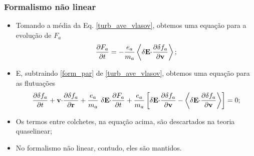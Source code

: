 \documentclass[10pt,aspectratio=1610,lualatex]{beamer}
\begin{document}
\begin{frame}
  \frametitle{Formalismo não linear}
  \begin{itemize}
    \item Tomando a média da Eq. \eqref{turb_ave_vlasov}, obtemos uma
    equação para a evolução de $F_a$
    \begin{equation}
      \frac{\partial F_a}{\partial t}
      =-\frac{e_a}{m_a}\left< \delta {\bf E \cdot}
      \frac{\partial \delta f_a}{\partial \bf v}\right>;
      \label{form_par}
    \end{equation}
    \pause 
    \item E, subtraindo \eqref{form_par} de \eqref{turb_ave_vlasov},
    obtemos uma equação para as flutuações
    \begin{equation}
      \frac{\partial \delta f_a}{\partial t}
      +{\bf v \cdot } \frac{\partial \delta f_a}{\partial {\bf r}}
      +\frac{e_a}{m_a}\ \delta {\bf E \cdot}
      \frac{\partial F_a}{\partial t}
      +\frac{e_a}{m_a}\left[\delta {\bf E \cdot}
      \frac{\partial \delta f_a}{\partial \bf v}
      -\left< \delta {\bf E \cdot}
      \frac{\partial \delta f_a}{\partial \bf v}\right>\right]=0;
      \label{flut}
    \end{equation}
    \item Os termos entre colchetes, na equação acima, são descartados
    na teoria quaselinear;
    \vspace{0.4cm}
    \item No formalismo não linear, contudo, eles são mantidos.
  \end{itemize}
\end{frame}
\end{document}
